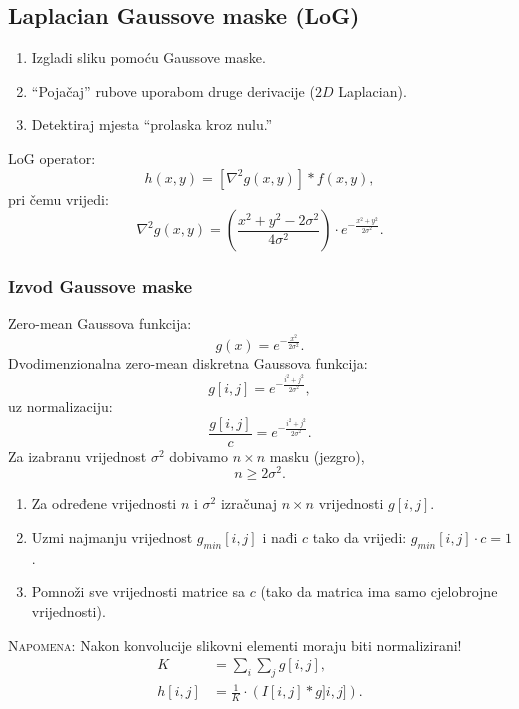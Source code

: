 \documentclass[11pt,english]{article}
\begin{document}
\subsection{Laplacian Gaussove maske (LoG)}
\begin{enumerate}
  \item Izgladi sliku pomoću Gaussove maske.
  \item ``Pojačaj'' rubove uporabom druge derivacije ($2D$ Laplacian).
  \item Detektiraj mjesta ``prolaska kroz nulu.''
\end{enumerate}
LoG operator:
$$h(x,y) = \left [ \nabla^2 g(x,y) \right ] \ast f(x,y),$$
pri čemu vrijedi:
$$\nabla^2g(x,y) = \left ( \frac{x^2+y^2-2\sigma^2}{4\sigma^2} \right ) \cdot e^{-\frac{x^2+y^2}{2\sigma^2}}.$$

\subsubsection{Izvod Gaussove maske}
Zero-mean Gaussova funkcija:
$$g(x)=e^{-\frac{x^2}{2\sigma^2}}.$$
Dvodimenzionalna zero-mean diskretna Gaussova funkcija:
$$g[i,j] = e^{-\frac{i^2+j^2}{2\sigma^2}},$$
uz normalizaciju:
$$\frac{g[i,j]}{c} = e^{-\frac{i^2+j^2}{2\sigma^2}}.$$
Za izabranu vrijednost $\sigma^2$ dobivamo $n \times n$ masku (jezgro),
$$n \geq 2\sigma^2.$$
\begin{enumerate}
  \item Za određene vrijednosti $n$ i $\sigma^2$ izračunaj $n \times n$ vrijednosti $g[i,j]$.
  \item Uzmi najmanju vrijednost $g_{min}[i,j]$ i nađi $c$ tako da vrijedi: $g_{min}[i,j] \cdot c = 1$.
  \item Pomnoži sve vrijednosti matrice sa $c$ (tako da matrica ima samo cjelobrojne vrijednosti).
\end{enumerate}
\textsc{Napomena:} Nakon konvolucije slikovni elementi moraju biti normalizirani!
\begin{align*}
K &= \sum_i\sum_j g[i,j],\\
h[i,j] &= \frac{1}{K} \cdot \left ( I[i,j] \ast g]i,j] \right ).
\end{align*}
\end{document}
